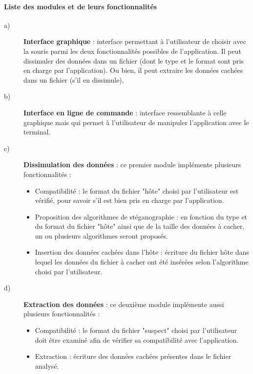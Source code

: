 \documentclass[11pt]{article}
\begin{document}
\paragraph{Liste des modules et de leurs fonctionnalités}
\begin{description}
\item[a)] \textbf{Interface graphique} : interface permettant à l'utilisateur de choisir avec la souris parmi les deux fonctionnalités possibles de l'application. 
Il peut dissimuler des données dans un fichier (dont le type et le format sont pris en charge par l'application). Ou bien, il peut extraire les données cachées dans un fichier (s'il en dissimule). 

\item[b)] \textbf{Interface en ligne de commande} : interface ressemblante à celle graphique mais qui permet à l'utilisateur de manipuler l'application avec le terminal. 

\item[c)] \textbf{Dissimulation des données} : ce premier module implémente plusieurs fonctionnalités : 
\begin{itemize}
\item Compatibilité : le format du fichier "hôte" choisi par l'utilisateur est vérifié, pour savoir s'il est bien pris en charge par l'application. 
\item Proposition des algorithmes de stéganographie : en fonction du type et du format du fichier "hôte" ainsi que de la taille des données à cacher, un ou plusieurs algorithmes seront proposés. 
\item Insertion des données cachées dans l'hôte : écriture du fichier hôte dans lequel les données du fichier à cacher ont été insérées selon l'algorithme choisi par l'utilisateur. 
\end{itemize}

\item[d)] \textbf{Extraction des données} : ce deuxième module implémente aussi plusieurs fonctionnalités : 
\begin{itemize}
\item Compatibilité : le format du fichier "suspect" choisi par l'utilisateur doit être examiné afin de vérifier sa compatibilité avec l'application. 
\item Extraction : écriture des données cachées présentes dans le fichier analysé. %
\end{itemize}

\end{description}
\end{document}
